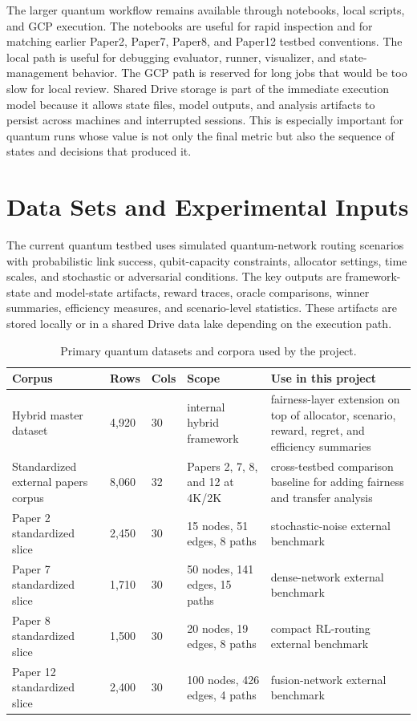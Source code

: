 \documentclass[conference]{IEEEtran}
\begin{document}
The larger quantum workflow remains available through notebooks, local scripts,
and GCP execution. The notebooks are useful for rapid inspection and for
matching earlier Paper2, Paper7, Paper8, and Paper12 testbed conventions. The
local path is useful for debugging evaluator, runner, visualizer, and
state-management behavior. The GCP path is reserved for long jobs that would be
too slow for local review. Shared Drive storage is part of the immediate
execution model because it allows state files, model outputs, and analysis
artifacts to persist across machines and interrupted sessions. This is
especially important for quantum runs whose value is not only the final metric
but also the sequence of states and decisions that produced it.

\section{Data Sets and Experimental Inputs}
The current quantum testbed uses simulated quantum-network routing scenarios
with probabilistic link success, qubit-capacity constraints, allocator
settings, time scales, and stochastic or adversarial conditions. The key
outputs are framework-state and model-state artifacts, reward traces, oracle
comparisons, winner summaries, efficiency measures, and scenario-level
statistics. These artifacts are stored locally or in a shared Drive data lake
depending on the execution path.

\begin{table}[t]
\caption{Primary quantum datasets and corpora used by the project.}
\label{tab:datasets}
\centering
\small
\begin{tabular}{p{}p{}p{}p{}p{}}
\toprule
\textbf{Corpus} & \textbf{Rows} & \textbf{Cols} & \textbf{Scope} & \textbf{Use in this project} \\
\midrule
Hybrid master dataset & 4,920 & 30 & internal hybrid framework & fairness-layer extension on top of allocator, scenario, reward, regret, and efficiency summaries \\
Standardized external papers corpus & 8,060 & 32 & Papers 2, 7, 8, and 12 at 4K/2K & cross-testbed comparison baseline for adding fairness and transfer analysis \\
Paper 2 standardized slice & 2,450 & 30 & 15 nodes, 51 edges, 8 paths & stochastic-noise external benchmark \\
Paper 7 standardized slice & 1,710 & 30 & 50 nodes, 141 edges, 15 paths & dense-network external benchmark \\
Paper 8 standardized slice & 1,500 & 30 & 20 nodes, 19 edges, 8 paths & compact RL-routing external benchmark \\
Paper 12 standardized slice & 2,400 & 30 & 100 nodes, 426 edges, 4 paths & fusion-network external benchmark \\
\bottomrule
\end{tabular}
\end{table}
\end{document}
